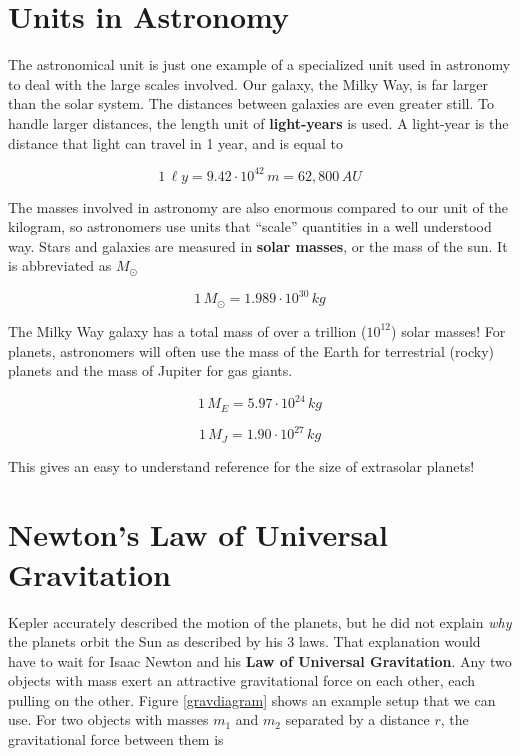 \documentclass[12pt]{book}
\begin{document}
\section{Units in Astronomy}

The astronomical unit is just one example of a specialized unit used in astronomy to deal with the large scales involved. Our galaxy, the Milky Way, is far larger than the solar system. The distances between galaxies are even greater still. To handle larger distances, the length unit of \textbf{light-years} is used. A light-year is the distance that light can travel in 1 year, and is equal to

\begin{equation}
1 \, \ell y = 9.42 \cdot 10^{42} \, m = 62,800 \, AU
\end{equation}

The masses involved in astronomy are also enormous compared to our unit of the kilogram, so astronomers use units that ``scale'' quantities in a well understood way. Stars and galaxies are measured in \textbf{solar masses}, or the mass of the sun. It is abbreviated as $M_{\odot}$

\begin{equation}
1 \, M_{\odot} = 1.989 \cdot 10^{30} \, kg
\end{equation}

The Milky Way galaxy has a total mass of over a trillion ($10^{12}$) solar masses! For planets, astronomers will often use the mass of the Earth for terrestrial (rocky) planets and the mass of Jupiter for gas giants.

\begin{equation}
1 \, M_E = 5.97 \cdot 10^{24} \, kg
\end{equation}

\begin{equation}
1 \, M_J = 1.90 \cdot 10^{27} \, kg
\end{equation}

This gives an easy to understand reference for the size of extrasolar planets!

\section{Newton's Law of Universal Gravitation}

Kepler accurately described the motion of the planets, but he did not explain \textit{why} the planets orbit the Sun as described by his 3 laws. That explanation would have to wait for Isaac Newton and his \textbf{Law of Universal Gravitation}. Any two objects with mass exert an attractive gravitational force on each other, each pulling on the other. Figure \ref{gravdiagram} shows an example setup that we can use. For two objects with masses $m_1$ and $m_2$ separated by a distance $r$, the gravitational force between them is
\end{document}
